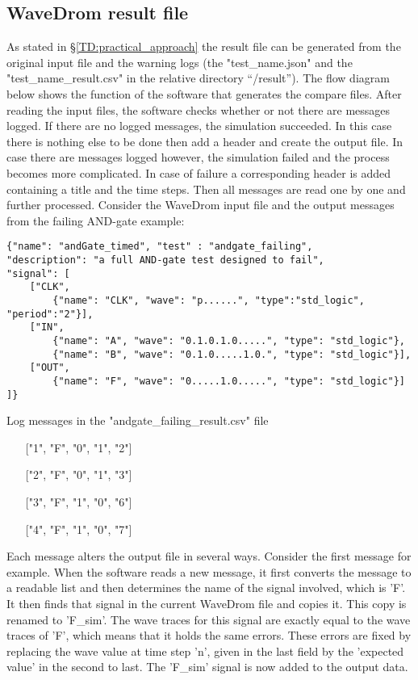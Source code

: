\subsection{WaveDrom result file}
As stated in §\ref{TD:practical_approach} the result file can be generated from the original input file and the warning logs (the "test\_name.json" and the "test\_name\_result.csv" in the relative directory “/result”). The flow diagram below shows the function of the software that generates the compare files. \newpage\noindent
After reading the input files, the software checks whether or not there are messages logged. If there are no logged messages, the simulation succeeded. In this case there is nothing else to be done then add a header and create the output file. In case there are messages logged however, the simulation failed and the process becomes more complicated.
\npar
In case of failure a corresponding header is added containing a title and the time steps. Then all messages are read one by one and further processed.
\npar
Consider the WaveDrom input file and the output messages from the failing AND-gate example:
\begin{lstlisting}[style=json, caption={Source file for a failing AND-gate example}, label={json:andgate_failing}]
{"name": "andGate_timed", "test" : "andgate_failing", 
"description": "a full AND-gate test designed to fail", 
"signal": [
	["CLK",
		{"name": "CLK", "wave": "p......", "type":"std_logic", "period":"2"}],
	["IN",
		{"name": "A", "wave": "0.1.0.1.0.....", "type": "std_logic"},
		{"name": "B", "wave": "0.1.0.....1.0.", "type": "std_logic"}],
	["OUT",
		{"name": "F", "wave": "0.....1.0.....", "type": "std_logic"}]
]}
\end{lstlisting}\noindent
\begin{customenv}
	\caption{Log messages in the "andgate\_failing\_result.csv" file}
	\begin{itemize}
		\centering
		\item [] ["1", "F", "0", "1", "2"]
		\item [] ["2", "F", "0", "1", "3"]
		\item [] ["3", "F", "1", "0", "6"]
		\item [] ["4", "F", "1", "0", "7"]
	\end{itemize}
\end{customenv}\newpage\noindent
Each message alters the output file in several ways. Consider the first message for example. When the software reads a new message, it first converts the message to a readable list and then determines the name of the signal involved, which is 'F'. It then finds that signal in the current WaveDrom file and copies it. This copy is renamed to 'F\_sim'. The wave traces for this signal are exactly equal to the wave traces of 'F', which means that it holds the same errors. These errors are fixed by replacing the wave value at time step 'n', given in the last field by the 'expected value' in the second to last. The 'F\_sim' signal is now added to the output data. 
